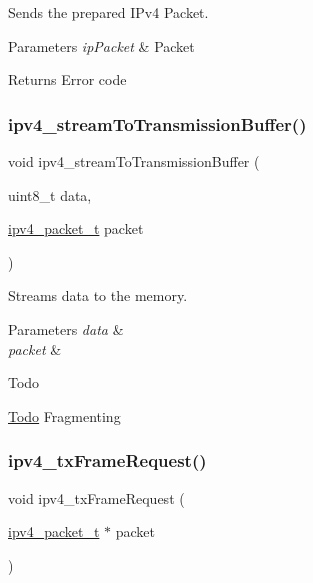 Sends the prepared I\+Pv4 Packet. 


\begin{DoxyParams}{Parameters}
{\em ip\+Packet} & Packet \\
\hline
\end{DoxyParams}
\begin{DoxyReturn}{Returns}
Error code 
\end{DoxyReturn}
\mbox{\label{group__ipv4_ga9b32058fa6f24f692e0915345b3373b2}} 
\subsubsection{\texorpdfstring{ipv4\_streamToTransmissionBuffer()}{ipv4\_streamToTransmissionBuffer()}}
{\footnotesize\ttfamily void ipv4\+\_\+stream\+To\+Transmission\+Buffer (\begin{DoxyParamCaption}\item[{uint8\+\_\+t}]{data,  }\item[{\mbox{\hyperlink{group__ipv4_ga68ea36d252d9332fd5e37d9aaedd06af}{ipv4\+\_\+packet\+\_\+t}}}]{packet }\end{DoxyParamCaption})}



Streams data to the memory. 


\begin{DoxyParams}{Parameters}
{\em data} & \\
\hline
{\em packet} & \\
\hline
\end{DoxyParams}
\begin{DoxyRefDesc}{Todo}
\item[\mbox{\hyperlink{todo__todo000012}{Todo}}]Fragmenting \end{DoxyRefDesc}
\mbox{\label{group__ipv4_ga1bf24e45bf60a70b43ea1f1738c9a4c5}} 
\subsubsection{\texorpdfstring{ipv4\_txFrameRequest()}{ipv4\_txFrameRequest()}}
{\footnotesize\ttfamily void ipv4\+\_\+tx\+Frame\+Request (\begin{DoxyParamCaption}\item[{\mbox{\hyperlink{group__ipv4_ga68ea36d252d9332fd5e37d9aaedd06af}{ipv4\+\_\+packet\+\_\+t}} $\ast$}]{packet }\end{DoxyParamCaption})}



